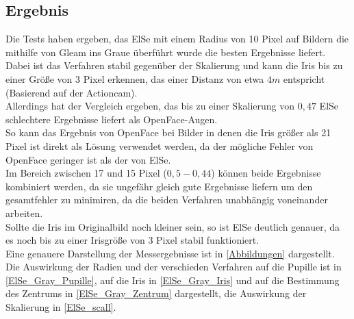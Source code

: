 \subsection{Ergebnis}
Die Tests haben ergeben, das ElSe mit einem Radius von 10 Pixel auf Bildern die mithilfe von Gleam ins Graue überführt wurde die besten Ergebnisse liefert. Dabei ist das Verfahren stabil gegenüber der Skalierung und kann die Iris bis zu einer Größe von 3 Pixel erkennen, das einer Distanz von etwa $4m$ entspricht (Basierend auf der Actioncam).\\
Allerdings hat der Vergleich ergeben, das bis zu einer Skalierung von $0,47$ ElSe schlechtere Ergebnisse liefert als OpenFace-Augen.\\
So kann das Ergebnis von OpenFace bei Bilder in denen die Iris größer als 21 Pixel ist direkt als Lösung verwendet werden, da der mögliche Fehler von OpenFace geringer ist als der von ElSe.\\
Im Bereich zwischen 17 und 15 Pixel ($0,5-0,44$) können beide Ergebnisse kombiniert werden, da sie ungefähr gleich gute Ergebnisse liefern um den gesamtfehler zu minimiren, da die beiden Verfahren unabhängig voneinander arbeiten.\\
Sollte die Iris im Originalbild noch kleiner sein, so ist ElSe deutlich genauer, da es noch bis zu einer Irisgröße von 3 Pixel stabil funktioniert.\\
Eine genauere Darstellung der Messergebnisse ist in \autoref{Abbildungen} dargestellt. Die Auswirkung der Radien und der verschieden Verfahren auf die Pupille ist in \autoref{ElSe_Gray_Pupille}, auf die Iris in \autoref{ElSe_Gray_Iris} und auf die Bestimmung des Zentrums in \autoref{ElSe_Gray_Zentrum} dargestellt, die Auswirkung der Skalierung in \autoref{ElSe_scall}.